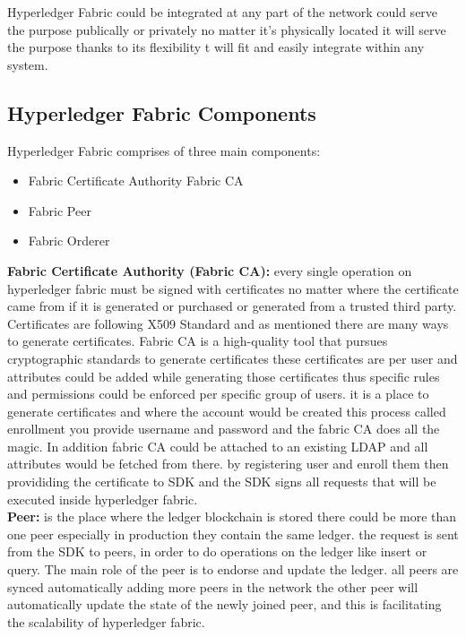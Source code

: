 Hyperledger Fabric could be integrated at any part of the network could serve the purpose publically or privately no matter it's physically located it will serve the purpose thanks to its flexibility t will fit and easily integrate within any system. \\ 


\subsection{Hyperledger Fabric Components} 

Hyperledger Fabric comprises of three main components:
\begin{itemize}
  \item Fabric Certificate Authority Fabric CA 
  \item Fabric Peer 
  \item Fabric Orderer 
\end{itemize} 


\textbf{ Fabric Certificate Authority (Fabric CA):} every single operation on hyperledger fabric must be signed with certificates no matter where the certificate came from if it is generated or purchased or generated from a trusted third party. Certificates are following X509 Standard and as mentioned there are many ways to generate certificates.
Fabric CA is a high-quality tool that pursues cryptographic standards to generate certificates these certificates are per user and attributes could be added while generating those certificates thus specific rules and permissions could be enforced per specific group of users. it is a place to generate certificates and  where the account would be created this process called enrollment you provide username and password and the fabric CA does all the magic. 
In addition fabric CA could be attached to an existing LDAP and all attributes would be fetched from there. 
by registering user and enroll them then provididing the certificate to SDK and the SDK signs all requests that will be executed inside hyperledger fabric. \\ 

\textbf{Peer:} is the place where the ledger blockchain is stored there could be more than one peer especially in production they contain the same ledger.  the request is sent from the SDK to peers, in order to do operations on the ledger like insert or query.  The main role of the peer is to endorse and update the ledger. all peers are synced automatically adding more peers in the network the other peer will automatically update the state of the newly joined peer, and this is facilitating the scalability of hyperledger fabric.  \\ 

